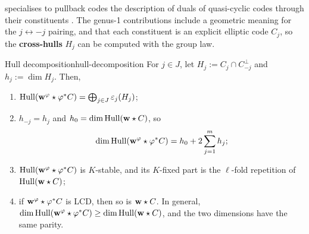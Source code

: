 \documentclass[twocolumn, 11pt]{scrartcl}
\begin{document}
 specialises to pullback codes the description of duals of quasi-cyclic codes through their constituents \cite[Prop.~4.1, Thm.~4.2]{ling2001algebraic}. The genus-1 contributions include a geometric meaning for the $j\leftrightarrow-j$ pairing, and that each constituent is an explicit elliptic code $C_j$, so the \textbf{cross-hulls} $H_j$ can be computed with the group law.

\begin{theorem}{Hull decomposition}{hull-decomposition}
    For $j\in J$, let $H_j:=C_j\cap C_{-j}^\perp$ and $h_j:=\dim H_j$. Then,
    \begin{enumerate}
        \item \label{enum:hd-decomp} $\operatorname{Hull}(\mathbf{w}^\varphi\star \varphi^*C)=\bigoplus_{j\in J}\varepsilon_j(H_j)$;
        \item \label{enum:hd-dim} $h_{-j}=h_j$ and $h_0=\dim\operatorname{Hull}(\mathbf{w}\star C)$, so
        \[ \dim\operatorname{Hull}(\mathbf{w}^\varphi\star \varphi^*C)=h_0+2\sum_{j=1}^{m}h_j; \]
        \item \label{enum:hd-qc} $\operatorname{Hull}(\mathbf{w}^\varphi\star \varphi^*C)$ is $K$-stable, and its $K$-fixed part is the $\ell$-fold repetition of $\operatorname{Hull}(\mathbf{w}\star C)$;
        \item \label{enum:hd-lcd} if $\mathbf{w}^\varphi\star \varphi^*C$ is LCD, then so is $\mathbf{w}\star C$. In general, $\dim\operatorname{Hull}(\mathbf{w}^\varphi\star \varphi^*C)\geq\dim\operatorname{Hull}(\mathbf{w}\star C)$, and the two dimensions have the same parity.
    \end{enumerate}
\end{theorem}
\end{document}
